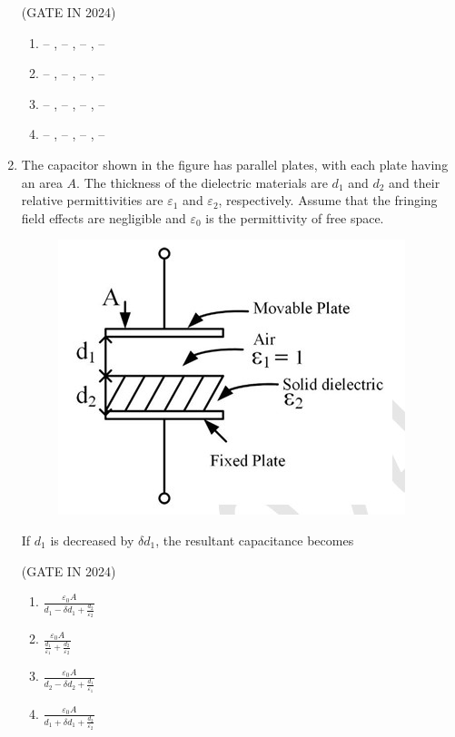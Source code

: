 \documentclass[journal,12pt,onecolumn]{IEEEtran}
\theoremstyle{remark}
\begin{document}
\begin{enumerate}
    \hfill{(GATE IN 2024)}
    \begin{enumerate}
        \item {} -- ,  -- ,  -- ,  -- 
        \item {} -- ,  -- ,  -- ,  -- 
        \item {} -- ,  -- ,  -- ,  -- 
        \item {} -- ,  -- ,  -- ,  -- 
    \end{enumerate}

    \item The capacitor shown in the figure  has parallel plates, with each plate having an
    area $A$. The thickness of the dielectric materials are $d_1$ and $d_2$ and their relative
    permittivities are $\varepsilon_1$ and $\varepsilon_2$, respectively. Assume that the fringing field effects are
    negligible and $\varepsilon_0$ is the permittivity of free space.
    \begin{figure}[H]
        \centering
        \includegraphics[width=0.5\columnwidth]{figs/p8.jpg}
        \caption*{}
        \label{fig:p8}
    \end{figure}
    If $d_1$ is decreased by $\delta d_1$, the resultant capacitance becomes

    \hfill{(GATE IN 2024)}
    \begin{enumerate}
        \item $\frac{\varepsilon_0 A}{d_1 - \delta d_1 + \frac{d_2}{\varepsilon_2}}$
        \item $\frac{\varepsilon_0 A}{\frac{d_1}{\varepsilon_1} + \frac{d_2}{\varepsilon_2}}$
        \item $\frac{\varepsilon_0 A}{d_2 - \delta d_2 + \frac{d_1}{\varepsilon_1}}$
        \item $\frac{\varepsilon_0 A}{d_1 + \delta d_1 + \frac{d_2}{\varepsilon_2}}$
    \end{enumerate}
    

\end{enumerate}
\end{document}
